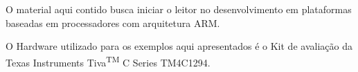 O material aqui contido busca iniciar o leitor no desenvolvimento em plataformas baseadas em processadores com arquitetura ARM.

O Hardware utilizado para os exemplos aqui apresentados é o Kit de 
avaliação da Texas Instruments Tiva\textsuperscript{TM} C Series TM4C1294.